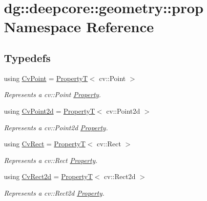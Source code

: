 \hypertarget{namespacedg_1_1deepcore_1_1geometry_1_1prop}{}\section{dg\+:\+:deepcore\+:\+:geometry\+:\+:prop Namespace Reference}
\label{namespacedg_1_1deepcore_1_1geometry_1_1prop}
\subsection*{Typedefs}
\begin{DoxyCompactItemize}
\item 
using \hyperlink{group___geometry_properties_gab53d82d9179777c4980eac502530a8c6}{Cv\+Point} = \hyperlink{structdg_1_1deepcore_1_1_property_t}{PropertyT}$<$ cv\+::\+Point $>$
\begin{DoxyCompactList}\small\item\em Represents a {\ttfamily cv\+::\+Point} \hyperlink{classdg_1_1deepcore_1_1_property}{Property}. \end{DoxyCompactList}\item 
using \hyperlink{group___geometry_properties_ga4125b4549e9900f3592c85733b223966}{Cv\+Point2d} = \hyperlink{structdg_1_1deepcore_1_1_property_t}{PropertyT}$<$ cv\+::\+Point2d $>$
\begin{DoxyCompactList}\small\item\em Represents a {\ttfamily cv\+::\+Point2d} \hyperlink{classdg_1_1deepcore_1_1_property}{Property}. \end{DoxyCompactList}\item 
using \hyperlink{group___geometry_properties_ga650cb626fb0e3ea63706df17b8e0e59d}{Cv\+Rect} = \hyperlink{structdg_1_1deepcore_1_1_property_t}{PropertyT}$<$ cv\+::\+Rect $>$
\begin{DoxyCompactList}\small\item\em Represents a {\ttfamily cv\+::\+Rect} \hyperlink{classdg_1_1deepcore_1_1_property}{Property}. \end{DoxyCompactList}\item 
using \hyperlink{group___geometry_properties_ga7009c5f5d32fd1adfe3e034126b527cb}{Cv\+Rect2d} = \hyperlink{structdg_1_1deepcore_1_1_property_t}{PropertyT}$<$ cv\+::\+Rect2d $>$
\begin{DoxyCompactList}\small\item\em Represents a {\ttfamily cv\+::\+Rect2d} \hyperlink{classdg_1_1deepcore_1_1_property}{Property}. \end{DoxyCompactList}\item 

\end{DoxyCompactItemize}
